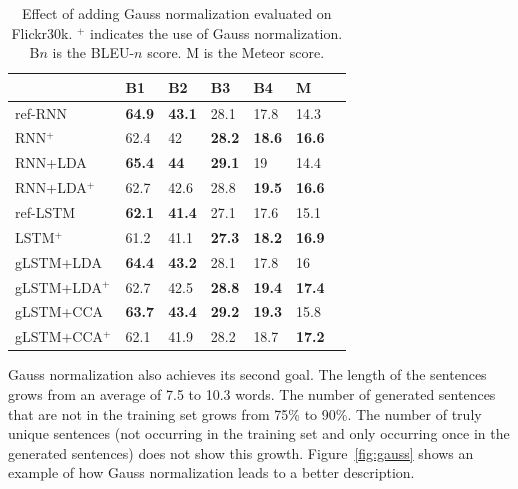 \documentclass[twoside,twocolumn]{article}
\begin{document}
	\begin{table}
		\centering
		\begin{tabular}{lllllll}
			& B1 & B2 & B3 & B4 & M \\ \hline
			ref-RNN          & \textbf{64.9}  & \textbf{43.1}     & 28.1   & 17.8   & 14.3          \\
			RNN$^+$       & 62.4   & 42     & \textbf{28.2}   & \textbf{18.6}   & \textbf{16.6}          \\ \hline
			RNN+LDA         & \textbf{65.4}   & \textbf{44}     & \textbf{29.1}   &19     & 14.4 \\
			RNN+LDA$^+$ & 62.7   & 42.6   & 28.8   & \textbf{19.5}   & \textbf{16.6}           \\ \hline 
			ref-LSTM         & \textbf{62.1}   & \textbf{41.4}   & 27.1   & 17.6   & 15.1  \\
			LSTM$^+$        & 61.2   & 41.1   & \textbf{27.3}   & \textbf{18.2}   & \textbf{16.9}  \\ \hline
			gLSTM+LDA         & \textbf{64.4}   & \textbf{43.2}   & 28.1   & 17.8   & 16  \\
			gLSTM+LDA$^+$ & 62.7   & 42.5   & \textbf{28.8}   & \textbf{19.4}   & \textbf{17.4}  \\\hline
			gLSTM+CCA         & \textbf{63.7}   & \textbf{43.4}   & \textbf{29.2}   &\textbf{19.3}   & 15.8  \\
			gLSTM+CCA$^+$ & 62.1   & 41.9   & 28.2   & 18.7   & \textbf{17.2}  \\\hline
		\end{tabular}
		\caption{Effect of adding Gauss normalization evaluated on Flickr30k. $^+$ indicates the use of Gauss normalization. B$n$ is the BLEU-$n$ score. M is the Meteor score.}
		\label{table:results_gauss}
	\end{table}
	
	Gauss normalization also achieves its second goal. The length of the sentences grows from an average of 7.5 to 10.3 words. The number of generated sentences that are not in the training set grows from 75\% to 90\%. The number of truly unique sentences (not occurring in the training set and only occurring once in the generated sentences) does not show this growth. Figure~\ref{fig:gauss} shows an example of how Gauss normalization leads to a better description.
	
\end{document}
